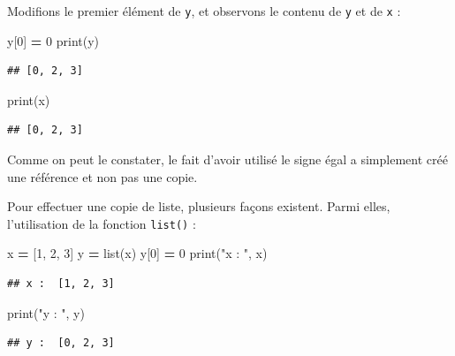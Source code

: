 \documentclass[
  12pt,
]{book}
\newenvironment{Shaded}{\begin{snugshade}}{\end{snugshade}}
\newcommand{\BuiltInTok}[1]{#1}
\newcommand{\DecValTok}[1]{\textcolor[rgb]{0.00,0.00,0.81}{#1}}
\newcommand{\NormalTok}[1]{#1}
\newcommand{\OperatorTok}[1]{\textcolor[rgb]{0.81,0.36,0.00}{\textbf{#1}}}
\newcommand{\StringTok}[1]{\textcolor[rgb]{0.31,0.60,0.02}{#1}}
\numberwithin{equation}{section}
\numberwithin{countremarque}{section}
\begin{document}
Modifions le premier élément de \texttt{y}, et observons le contenu de \texttt{y} et de \texttt{x} :

\begin{Shaded}
\begin{Highlighting}[]
\NormalTok{y[}\DecValTok{0}\NormalTok{] }\OperatorTok{=} \DecValTok{0}
\BuiltInTok{print}\NormalTok{(y)}
\end{Highlighting}
\end{Shaded}

\begin{lstlisting}
## [0, 2, 3]
\end{lstlisting}

\begin{Shaded}
\begin{Highlighting}[]
\BuiltInTok{print}\NormalTok{(x)}
\end{Highlighting}
\end{Shaded}

\begin{lstlisting}
## [0, 2, 3]
\end{lstlisting}

Comme on peut le constater, le fait d'avoir utilisé le signe égal a simplement créé une référence et non pas une copie.

Pour effectuer une copie de liste, plusieurs façons existent. Parmi elles, l'utilisation de la fonction \texttt{list()} :

\begin{Shaded}
\begin{Highlighting}[]
\NormalTok{x }\OperatorTok{=}\NormalTok{ [}\DecValTok{1}\NormalTok{, }\DecValTok{2}\NormalTok{, }\DecValTok{3}\NormalTok{]}
\NormalTok{y }\OperatorTok{=} \BuiltInTok{list}\NormalTok{(x)}
\NormalTok{y[}\DecValTok{0}\NormalTok{] }\OperatorTok{=} \DecValTok{0}
\BuiltInTok{print}\NormalTok{(}\StringTok{"x : "}\NormalTok{, x)}
\end{Highlighting}
\end{Shaded}

\begin{lstlisting}
## x :  [1, 2, 3]
\end{lstlisting}

\begin{Shaded}
\begin{Highlighting}[]
\BuiltInTok{print}\NormalTok{(}\StringTok{"y : "}\NormalTok{, y)}
\end{Highlighting}
\end{Shaded}

\begin{lstlisting}
## y :  [0, 2, 3]
\end{lstlisting}
\end{document}
